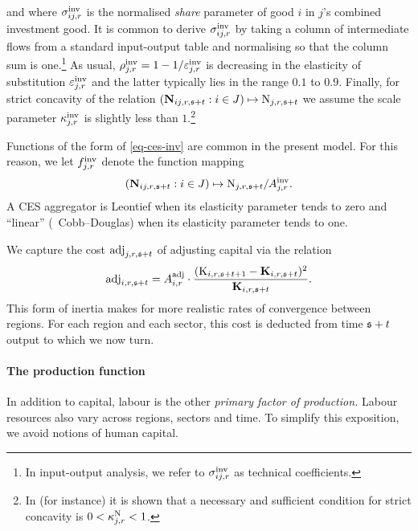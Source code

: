 \documentclass[12pt,a4paper,twoside, draft]{article}
\begin{document}
and where $\sigma_{ij, r}^{\textup{inv}}$ is the normalised \emph{share}
parameter of good $i$ in $j$'s combined investment good.
It is common to derive $\sigma_{ij, r}^{\textup{inv}}$ by taking a
column of intermediate flows from a standard input-output table and
normalising so that the column sum is one.\footnote{
  In input-output analysis, we refer to $\sigma_{ij, r}^{\textup{inv}}$ 
  as technical coefficients.
}
As usual, $\rho_{j, r}^{\textup{inv}}
  = 1 - 1 / \varepsilon_{j, r}^{\textup{inv}}$ is decreasing in the elasticity of
  substitution $\varepsilon_{j, r}^{\textup{inv}}$ and the latter typically
  lies in the range $ 0.1 $ to $0.9$.
Finally, for strict concavity of the relation
$\left(\mathbf{N}_{ij, r, \mathfrak{s} + t} : i \in J\right)
  \mapsto \textup{N}_{j, r, \mathfrak{s} + t}$ we assume the scale parameter 
$\kappa_{j, r}^\textup{inv}$ is slightly less than $1$.\footnote{
  In \citet[Theorem 2]{Kojic-Concavity} (for instance) it is shown that a
  necessary and sufficient condition for strict concavity is
  $0 < \kappa_{j, r}^\textup{N} < 1$.
}

\begin{remark}
  Functions of the form of \cref{eq-ces-inv} are common in the present
  model. 
  For this reason, we let $f_{j, r}^{\textup{inv}}$ denote the function mapping
\[
  (\mathbf{N}_{ij, r, \mathfrak{s} + t} : i \in J)
  \mapsto \textup{N}_{j, r, \mathfrak{s} + t} / A_{j, r}^{\textup{inv}}.
\]
  A CES aggregator is Leontief when its elasticity
  parameter tends to zero and ``linear'' (\ie\ Cobb--Douglas) when its
  elasticity parameter tends to one.
  
\end{remark}
We capture the cost $\textup{adj}_{j, r, \mathfrak{s} + t}$ of adjusting capital
via the relation 
\begin{equation}
  \textup{adj}_{i, r, \mathfrak{s} + t}
    = A_{i, r} ^ \textup{adj} 
      \cdot \frac{(\textup{K}_{i, r, \mathfrak{s} + t + 1}
      - \mathbf{K}_{i, r, \mathfrak{s} + t})^2}
        {\mathbf{K}_{i, r, \mathfrak{s} + t}}.
\end{equation}
This form of inertia makes for more realistic rates of convergence between
regions.
For each region and each sector, this cost is deducted from time $\mathfrak{s} + t$ output
to which we now turn.
\paragraph{The production function}
In addition to capital, labour is the other \emph{primary factor of
production.}
Labour resources also vary across regions, sectors and time.
To simplify this exposition, we avoid notions of human capital.
\end{document}
